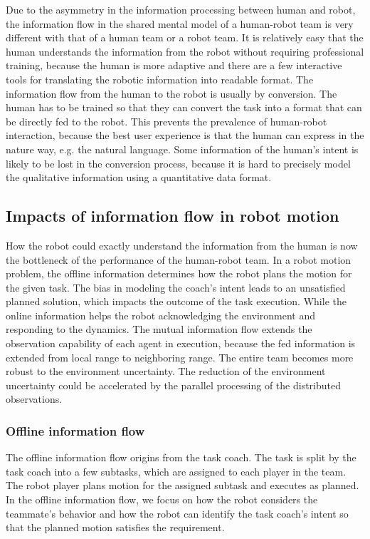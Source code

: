 \documentclass[phd]{byuprop}
\begin{document}
Due to the asymmetry in the information processing between human and robot, the information flow in the shared mental model of a human-robot team is very different with that of a human team or a robot team.
It is relatively easy that the human understands the information from the robot without requiring professional training, because the human is more adaptive and there are a few interactive tools for translating the robotic information into readable format.
The information flow from the human to the robot is usually by conversion.
The human has to be trained so that they can convert the task into a format that can be directly fed to the robot.
This prevents the prevalence of human-robot interaction, because the best user experience is that the human can express in the nature way, e.g. the natural language.
Some information of the human's intent is likely to be lost in the conversion process, because it is hard to precisely model the qualitative information using a quantitative data format.

\subsection{Impacts of information flow in robot motion}

How the robot could exactly understand the information from the human is now the bottleneck of the performance of the human-robot team.
In a robot motion problem, the offline information determines how the robot plans the motion for the given task.
The bias in modeling the coach's intent leads to an unsatisfied planned solution, which impacts the outcome of the task execution.
While the online information helps the robot acknowledging the environment and responding to the dynamics.
The mutual information flow extends the observation capability of each agent in execution, because the fed information is extended from local range to neighboring range.
The entire team becomes more robust to the environment uncertainty.
The reduction of the environment uncertainty could be accelerated by the parallel processing of the distributed observations.

\subsubsection{Offline information flow}

The offline information flow origins from the task coach.
The task is split by the task coach into a few subtasks, which are assigned to each player in the team. 
The robot player plans motion for the assigned subtask and executes as planned.
In the offline information flow, we focus on how the robot considers the teammate's behavior and how the robot can identify the task coach's intent so that the planned motion satisfies the requirement.
\end{document}
